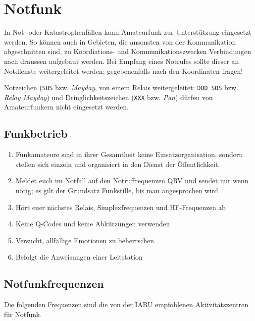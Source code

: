 

\section{Notfunk}

In Not- oder Katastrophenfällen kann Amateurfunk zur Unterstützung eingesetzt werden. So können auch in Gebieten, die ansonsten von der Kommunikation abgeschnitten sind, zu Koordiations- und Kommunikationszwecken Verbindungen nach draussen aufgebaut werden. Bei Empfang eines Notrufes sollte dieser an Notdienste weitergeleitet werden; gegebenenfalls nach den Koordinaten fragen!

Notzeichen (\texttt{SOS} bzw. \textit{Mayday}, von einem Relais weitergeleitet: \texttt{DDD SOS} bzw. \textit{Relay Mayday}) und Dringlichkeitszeichen (\texttt{XXX} bzw. \textit{Pan}) dürfen von Amateurfunkern nicht eingesetzt werden.


\subsection{Funkbetrieb}
\begin{enumerate}
 \item Funkamateure sind in ihrer Gesamtheit keine Einsatzorganisation, sondern stellen sich einzeln und organisiert in den Dienst der Öffentlichkeit.
 \item Meldet euch im Notfall auf den Notruffrequenzen QRV und sendet nur wenn nötig; es gilt der Grund­satz Funkstille, bis man angesprochen wird
 \item Hört euer nächstes Relais, Simplexfrequenzen und HF-Frequenzen ab
 \item Keine Q-Codes und keine Abkürzungen verwenden
 \item Versucht, allfällige Emotionen zu beherrschen
 \item Befolgt die Anweisungen einer Leitstation
\end{enumerate}

\subsection{Notfunkfrequenzen}\label{sec:notruffrequenzen}
Die folgenden Frequenzen sind die von der IARU empfohlenen Aktivitätszentren für Notfunk. 

